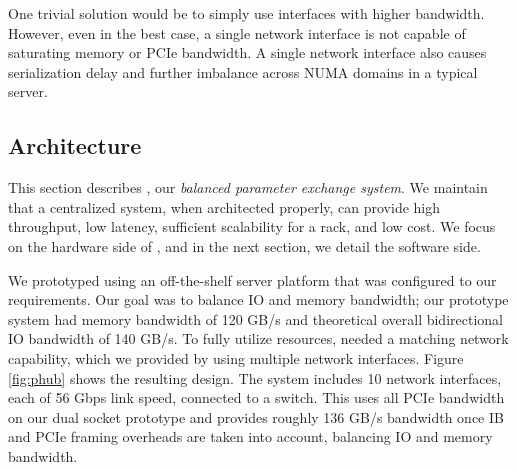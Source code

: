 
One trivial solution would be to simply use interfaces with higher bandwidth. However, even in the best case, a single network interface is not capable of saturating memory or PCIe bandwidth. A single network interface also causes serialization delay and further imbalance across NUMA domains in a typical server. %



\subsection{\pbox Architecture}
This section describes \pbox, our \textit{balanced parameter exchange system}. We maintain that a centralized system, when architected properly, can provide high throughput, low latency, sufficient scalability for a rack, and low cost. We focus on the hardware side of \pbox, and in the next section, we detail the software side.

We prototyped \pbox using an off-the-shelf server platform that was configured to our requirements. Our goal was to balance IO and memory bandwidth; our prototype system had memory bandwidth of 120 GB/s and theoretical overall bidirectional IO bandwidth of 140 GB/s. To fully utilize resources, \pbox needed a matching network capability, which we provided by using multiple network interfaces. Figure \ref{fig:phub} shows the resulting \pbox design. The system includes 10 network interfaces, each of 56 Gbps link speed, connected to a switch. This uses all PCIe bandwidth on our dual socket prototype and provides roughly 136 GB/s bandwidth once IB and PCIe framing overheads are taken into account, balancing IO and memory bandwidth.

